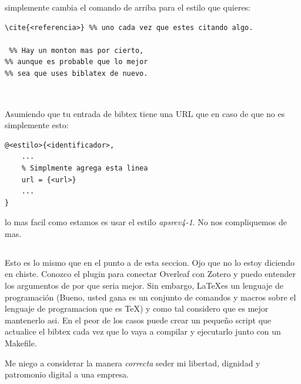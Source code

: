 \documentclass[12pt]{exam}
\begin{document}
simplemente cambia el comando de arriba para el estilo que quieres:

\begin{verbatim}
\cite{<referencia>} %% uno cada vez que estes citando algo.

 %% Hay un monton mas por cierto,
%% aunque es probable que lo mejor
%% sea que uses biblatex de nuevo.


\end{verbatim}

\subsection{}

Asumiendo que tu entrada de bibtex tiene una URL que en caso de que no es simplemente esto:
\begin{verbatim}
@<estilo>{<identificador>,
    ...
    % Simplmente agrega esta linea 
    url = {<url>}
    ...
}
\end{verbatim}

lo mas facil como estamos es usar el estilo \textit{apsrev4-1}. No nos compliquemos de mas.

\subsection{}

Esto es lo mismo que en el punto a de esta seccion. Ojo que no lo estoy diciendo en chiste. Conozco el plugin para conectar Overleaf con Zotero y puedo entender los argumentos de por que seria mejor. Sin embargo, \LaTeX es un lenguaje de programación (Bueno, usted gana es un conjunto de comandos y macros sobre el lenguaje de programacion que es \TeX) y como tal considero que es mejor mantenerlo asi. En el peor de los casos puede crear un pequeño script que actualice el bibtex cada vez que lo vaya a compilar y ejecutarlo junto con un Makefile. 

Me niego a considerar la manera \textit{correcta} seder mi libertad, dignidad y patromonio digital a una empresa.



  
% 

\end{document}
